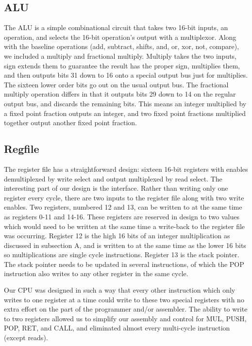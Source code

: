\documentclass[onecolumn]{IEEEtran}
\begin{document}
\subsection{ALU}
The ALU is a simple combinational circuit that takes two 16-bit inputs, an operation, and selects the 16-bit operation's output with a multiplexor.  Along with the baseline operations (add, subtract, shifts, and, or, xor, not, compare), we included a multiply and fractional multiply.  Multiply takes the two inputs, sign extends them to guarantee the result has the proper sign, multiplies them, and then outputs bits 31 down to 16 onto a special output bus just for multiplies.  The sixteen lower order bits go out on the usual output bus.  The fractional multiply operation differs in that it outputs bits 29 down to 14 on the regular output bus, and discards the remaining bits.  This means an integer multiplied by a fixed point fraction outputs an integer, and two fixed point fractions multiplied together output another fixed point fraction.

\subsection{Regfile}
The register file has a straightforward design: sixteen 16-bit registers with enables demultiplexed by write select and output multiplexed by read select.  The interesting part of our design is the interface.  Rather than writing only one register every cycle, there are two inputs to the register file along with two write enables.  Two registers, numbered 12 and 13, can be written to at the same time as registers 0-11 and 14-16.  These registers are reserved in design to two values which would need to be written at the same time a write-back to the register file was occurring.  Register 12 is the high 16 bits of an integer multiplication as discussed in subsection A, and is written to at the same time as the lower 16 bits so multiplications are single cycle instructions.  Register 13 is the stack pointer.  The stack pointer needs to be updated in several instructions, of which the POP instruction also writes to any other register in the same cycle.

Our CPU was designed in such a way that every other instruction which only writes to one register at a time could write to these two special registers with no extra effort on the part of the programmer and/or assembler. The ability to write to two registers allowed us to simplify our assembly and control for MUL, PUSH, POP, RET, and CALL, and eliminated almost every multi-cycle instruction (except reads).
\end{document}
